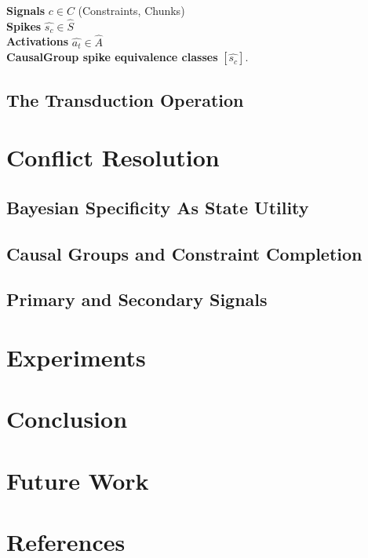 \documentclass{article}
\begin{document}
\begin{multicols}{2}
\textbf{Signals} $c \in C$ (Constraints, Chunks)\\

\textbf{Spikes} $\hat{s_c} \in \hat{S}$\\

\textbf{Activations} $\hat{a_t} \in \hat{A}$\\

\textbf{CausalGroup spike equivalence classes} $[\hat{s_c}]$.\\

\subsection{The Transduction Operation}

\section{Conflict Resolution}

\subsection{Bayesian Specificity As State Utility}

\subsection{Causal Groups and Constraint Completion}

\subsection{Primary and Secondary Signals}

\section{Experiments}


\section{Conclusion}


\section{Future Work}


\section{References}


\end{multicols}
\end{document}
